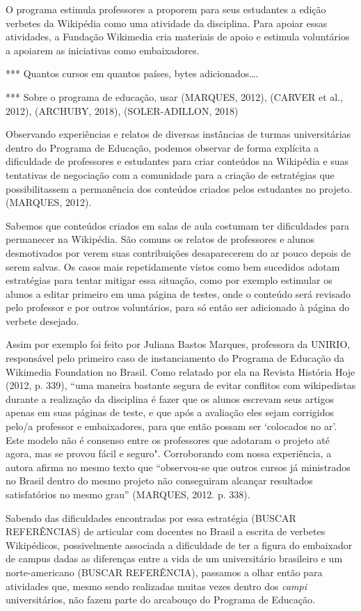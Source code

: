 O programa estimula professores a proporem para seus estudantes a edição verbetes da Wikipédia como uma atividade da disciplina. Para apoiar essas atividades, a Fundação Wikimedia cria materiais de apoio e estimula voluntários a apoiarem as iniciativas como embaixadores.
    
***  Quantos cursos em quantos países, bytes adicionados….

*** Sobre o programa de educação, usar (MARQUES, 2012), (CARVER et al., 2012), (ARCHUBY, 2018), (SOLER-ADILLON, 2018)

Observando experiências e relatos de diversas instâncias de turmas universitárias dentro do Programa de Educação, podemos observar de forma explícita a dificuldade de professores e estudantes para criar conteúdos na Wikipédia e suas tentativas de negociação com a comunidade para a criação de estratégias que possibilitassem a permanência dos conteúdos criados pelos estudantes no projeto.(MARQUES, 2012).

Sabemos que conteúdos criados em salas de aula costumam ter dificuldades para permanecer na Wikipédia. São comuns os relatos de professores e alunos desmotivados por verem suas contribuições desaparecerem do ar pouco depois de serem salvas. Os casos mais repetidamente vistos como bem sucedidos adotam estratégias para tentar mitigar essa situação, como por exemplo estimular os alunos a editar primeiro em uma página de testes, onde o conteúdo será revisado pelo professor e por outros voluntários, para só então ser adicionado à página do verbete desejado.

Assim por exemplo foi feito por Juliana Bastos Marques, professora da UNIRIO, responsável pelo primeiro caso de instanciamento do Programa de Educação da Wikimedia Foundation no Brasil. Como relatado por ela na Revista História Hoje (2012, p. 339), ``uma maneira bastante segura de evitar conflitos com wikipedistas durante a realização da disciplina é fazer que os alunos escrevam seus artigos apenas em suas páginas de teste, e que após a avaliação eles sejam corrigidos pelo/a professor e embaixadores, para que então possam ser ‘colocados no ar’. Este modelo não é consenso entre os professores que adotaram o projeto até agora, mas se provou fácil e seguro". Corroborando com nossa experiência, a autora afirma no mesmo texto que “observou-se que outros cursos já ministrados no Brasil dentro do mesmo projeto não conseguiram alcançar resultados satisfatórios no mesmo grau'' (MARQUES, 2012. p. 338).

Sabendo das dificuldades encontradas por essa estratégia (BUSCAR REFERÊNCIAS) de articular com docentes no Brasil a escrita de verbetes Wikipédicos, possivelmente associada a dificuldade de ter a figura do embaixador de campus dadas as diferenças entre a vida de um universitário brasileiro e um norte-americano (BUSCAR REFERÊNCIA), passamos a olhar então para atividades que, mesmo sendo realizadas muitas vezes dentro dos \textit{campi} universitários, não fazem parte do arcabouço do Programa de Educação.

